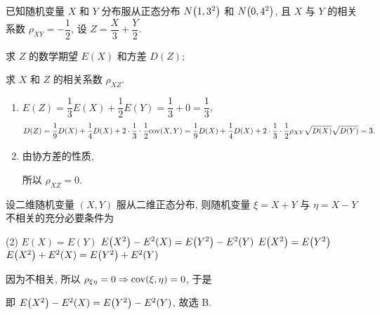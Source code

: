 \begin{example}[1994 数一]
    已知随机变量 $X$ 和 $Y$ 分布服从正态分布 $N\qty(1,3^2)$ 和 $N\qty(0,4^2)$, 且 $X$ 与 $Y$ 的相关系数 $\rho_{XY}=-\dfrac{1}{2}$,
    设 $Z=\dfrac{X}{3}+\dfrac{Y}{2}$.\newline
    \begin{enumerate*}[label=(\arabic{*})]
        \item 求 $Z$ 的数学期望 $E(X)$ 和方差 $D(Z)$;
        \item 求 $X$ 和 $Z$ 的相关系数 $\rho_{XZ}.$
    \end{enumerate*}
\end{example}
\begin{solution}
    \begin{enumerate}[label=(\arabic{*})]
        \item $E(Z)=\dfrac{1}{3}E(X)+\dfrac{1}{2}E(Y)=\dfrac{1}{3}+0=\dfrac{1}{3}$,
              $$D(Z)=\dfrac{1}{9}D(X)+\dfrac{1}{4}D(X)+2\cdot\dfrac{1}{3}\cdot\dfrac{1}{2}\mathrm{cov}(X,Y)=\dfrac{1}{9}D(X)+\dfrac{1}{4}D(X)+2\cdot\dfrac{1}{3}\cdot\dfrac{1}{2}\rho_{XY}\sqrt{D(X)}\sqrt{D(Y)}=3.$$
        \item 由协方差的性质,
              所以 $\rho_{XZ}=0.$
    \end{enumerate}
\end{solution}

\begin{example}[2000 数一]
    设二维随机变量 $(X,Y)$ 服从二维正态分布, 则随机变量 $\xi=X+Y$ 与 $\eta=X-Y$ 不相关的充分必要条件为
    \begin{tasks}(2)
        \task $E(X)=E(Y)$
        \task $E\qty(X^2)-E^2(X)=E\qty(Y^2)-E^2(Y)$
        \task $E\qty(X^2)=E\qty(Y^2)$
        \task $E\qty(X^2)+E^2(X)=E\qty(Y^2)+E^2(Y)$
    \end{tasks}
\end{example}
\begin{solution}
    因为不相关, 所以 $\rho_{\xi\eta}=0\Rightarrow \mathrm{cov}(\xi,\eta)=0$, 于是
    即 $E\qty(X^2)-E^2(X)=E\qty(Y^2)-E^2(Y)$, 故选 B.
\end{solution}

